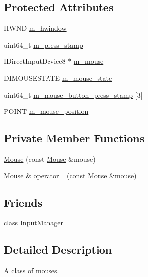 \subsection*{Protected Attributes}
\begin{DoxyCompactItemize}
\item 
H\+W\+ND \hyperlink{classmage_1_1_mouse_a0c67906df7b8b0cce013c724be4625ac}{m\+\_\+hwindow}
\item 
uint64\+\_\+t \hyperlink{classmage_1_1_mouse_a32b30d3c37a2082869f4ff4f522dfbf8}{m\+\_\+press\+\_\+stamp}
\item 
I\+Direct\+Input\+Device8 $\ast$ \hyperlink{classmage_1_1_mouse_a873713cdf019671a94952d88faeb2b7a}{m\+\_\+mouse}
\item 
D\+I\+M\+O\+U\+S\+E\+S\+T\+A\+TE \hyperlink{classmage_1_1_mouse_af99645fb4226077abee4532a5e663066}{m\+\_\+mouse\+\_\+state}
\item 
uint64\+\_\+t \hyperlink{classmage_1_1_mouse_a0f5a38e23bdf7eae1b7b1030a53edff0}{m\+\_\+mouse\+\_\+button\+\_\+press\+\_\+stamp} \mbox{[}3\mbox{]}
\item 
P\+O\+I\+NT \hyperlink{classmage_1_1_mouse_a2a8332ef7a4daa0f9ed48a9a1ad80684}{m\+\_\+mouse\+\_\+position}
\end{DoxyCompactItemize}
\subsection*{Private Member Functions}
\begin{DoxyCompactItemize}
\item 
\hyperlink{classmage_1_1_mouse_ab510a83c48c14fe4855d39cf4e9599d6}{Mouse} (const \hyperlink{classmage_1_1_mouse}{Mouse} \&mouse)
\item 
\hyperlink{classmage_1_1_mouse}{Mouse} \& \hyperlink{classmage_1_1_mouse_ae3c9c2063e7323f37bec2bcee773e0e8}{operator=} (const \hyperlink{classmage_1_1_mouse}{Mouse} \&mouse)
\end{DoxyCompactItemize}
\subsection*{Friends}
\begin{DoxyCompactItemize}
\item 
class \hyperlink{classmage_1_1_mouse_af0e8c3dcc20b7ddcaf63506363a22821}{Input\+Manager}
\end{DoxyCompactItemize}


\subsection{Detailed Description}
A class of mouses. 

